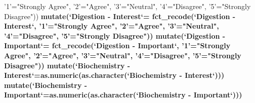 \documentclass[]{article}
\newenvironment{Shaded}{\begin{snugshade}}{\end{snugshade}}
\newcommand{\KeywordTok}[1]{\textcolor[rgb]{0.13,0.29,0.53}{\textbf{#1}}}
\newcommand{\DataTypeTok}[1]{\textcolor[rgb]{0.13,0.29,0.53}{#1}}
\newcommand{\StringTok}[1]{\textcolor[rgb]{0.31,0.60,0.02}{#1}}
\newcommand{\OperatorTok}[1]{\textcolor[rgb]{0.81,0.36,0.00}{\textbf{#1}}}
\newcommand{\NormalTok}[1]{#1}
\begin{document}
\begin{Shaded}
\begin{Highlighting}[]
{{{{                                                 \StringTok{'1'}\NormalTok{=}\StringTok{"Strongly Agree"}\NormalTok{,}
                                                 \StringTok{'2'}\NormalTok{=}\StringTok{"Agree"}\NormalTok{,}
                                                 \StringTok{'3'}\NormalTok{=}\StringTok{"Neutral"}\NormalTok{,}
                                                 \StringTok{'4'}\NormalTok{=}\StringTok{"Disagree"}\NormalTok{,}
                                                 \StringTok{'5'}\NormalTok{=}\StringTok{"Strongly Disagree"}\NormalTok{)) }\OperatorTok{%
\StringTok{    }\KeywordTok{mutate}\NormalTok{(}\StringTok{`}\DataTypeTok{Digestion - Interest}\StringTok{`}\NormalTok{=}\StringTok{ }\KeywordTok{fct_recode}\NormalTok{(}\StringTok{`}\DataTypeTok{Digestion - Interest}\StringTok{`}\NormalTok{, }
                                                 \StringTok{'1'}\NormalTok{=}\StringTok{"Strongly Agree"}\NormalTok{,}
                                                 \StringTok{'2'}\NormalTok{=}\StringTok{"Agree"}\NormalTok{,}
                                                 \StringTok{'3'}\NormalTok{=}\StringTok{"Neutral"}\NormalTok{,}
                                                 \StringTok{'4'}\NormalTok{=}\StringTok{"Disagree"}\NormalTok{,}
                                                 \StringTok{'5'}\NormalTok{=}\StringTok{"Strongly Disagree"}\NormalTok{)) }\OperatorTok{%
\StringTok{      }\KeywordTok{mutate}\NormalTok{(}\StringTok{`}\DataTypeTok{Digestion - Important}\StringTok{`}\NormalTok{=}\StringTok{ }\KeywordTok{fct_recode}\NormalTok{(}\StringTok{`}\DataTypeTok{Digestion - Important}\StringTok{`}\NormalTok{, }
                                                 \StringTok{'1'}\NormalTok{=}\StringTok{"Strongly Agree"}\NormalTok{,}
                                                 \StringTok{'2'}\NormalTok{=}\StringTok{"Agree"}\NormalTok{,}
                                                 \StringTok{'3'}\NormalTok{=}\StringTok{"Neutral"}\NormalTok{,}
                                                 \StringTok{'4'}\NormalTok{=}\StringTok{"Disagree"}\NormalTok{,}
                                                 \StringTok{'5'}\NormalTok{=}\StringTok{"Strongly Disagree"}\NormalTok{)) }\OperatorTok{%
\StringTok{  }\KeywordTok{mutate}\NormalTok{(}\StringTok{`}\DataTypeTok{Biochemistry - Interest}\StringTok{`}\NormalTok{=}\KeywordTok{as.numeric}\NormalTok{(}\KeywordTok{as.character}\NormalTok{(}\StringTok{`}\DataTypeTok{Biochemistry - Interest}\StringTok{`}\NormalTok{))) }\OperatorTok{%
\StringTok{  }\KeywordTok{mutate}\NormalTok{(}\StringTok{`}\DataTypeTok{Biochemistry - Important}\StringTok{`}\NormalTok{=}\KeywordTok{as.numeric}\NormalTok{(}\KeywordTok{as.character}\NormalTok{(}\StringTok{`}\DataTypeTok{Biochemistry - Important}\StringTok{`}\NormalTok{))) }\OperatorTok{%
}}}}}}}}}
\end{Highlighting}
\end{Shaded}
\end{document}

